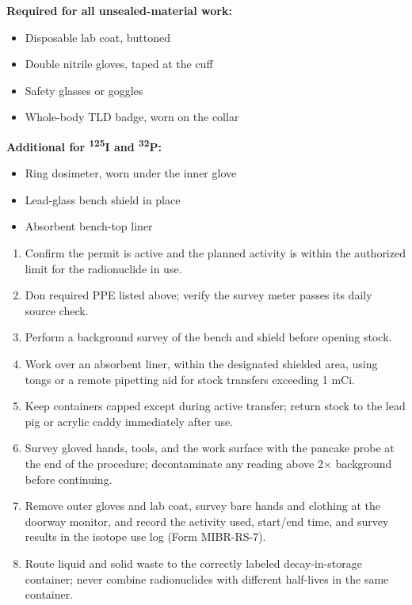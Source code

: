 

\begin{minipage}[t]{0.48\linewidth}
\textbf{Required for all unsealed-material work:}
\begin{itemize}[label=\OpenBox]
\item Disposable lab coat, buttoned
\item Double nitrile gloves, taped at the cuff
\item Safety glasses or goggles
\item Whole-body TLD badge, worn on the collar
\end{itemize}
\end{minipage}%
\hfill
\begin{minipage}[t]{0.48\linewidth}
\textbf{Additional for \textsuperscript{125}I and \textsuperscript{32}P:}
\begin{itemize}[label=\OpenBox]
\item Ring dosimeter, worn under the inner glove
\item Lead-glass bench shield in place
\item Absorbent bench-top liner
\end{itemize}
\end{minipage}
\par


\begin{enumerate}
\item Confirm the permit is active and the planned activity is within the authorized limit for
the radionuclide in use.
\item Don required PPE listed above; verify the survey meter passes its daily source check.
\item Perform a background survey of the bench and shield before opening stock.
\item Work over an absorbent liner, within the designated shielded area, using tongs or a
remote pipetting aid for stock transfers exceeding 1 mCi.
\item Keep containers capped except during active transfer; return stock to the lead pig or
acrylic caddy immediately after use.
\item Survey gloved hands, tools, and the work surface with the pancake probe at the end of the
procedure; decontaminate any reading above 2$\times$ background before continuing.
\item Remove outer gloves and lab coat, survey bare hands and clothing at the doorway monitor,
and record the activity used, start/end time, and survey results in the isotope use log
(Form MIBR-RS-7).
\item Route liquid and solid waste to the correctly labeled decay-in-storage container; never
combine radionuclides with different half-lives in the same container.
\end{enumerate}

